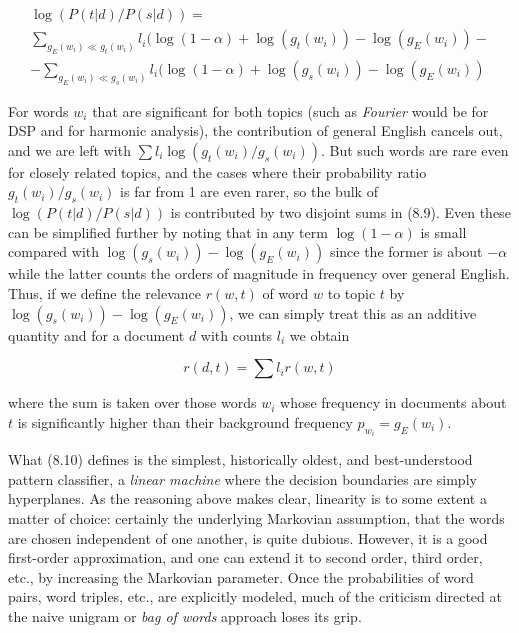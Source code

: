 \begin{eqnarray}
\log(P(t|d)/P(s|d)) = \nonumber\\
\sum_{g_E(w_i) \ll g_t(w_i)} l_i (\log(1-\alpha) +\log(g_t(w_i))-\log(g_E(w_i)) -\nonumber\\
- \sum_{g_E(w_i) \ll g_s(w_i)} l_i (\log(1-\alpha) +\log(g_s(w_i))-\log(g_E(w_i))
\end{eqnarray}
 
\noindent
For words $w_i$ that are significant for both topics (such as {\it Fourier}
would be for DSP and for harmonic analysis), the contribution of general
English cancels out, and we are left with $\sum l_i \log(g_t(w_i)/g_s(w_i))$.
But such words are rare even for closely related topics, and the cases where
their probability ratio $g_t(w_i)/g_s(w_i)$ is far from 1 are even rarer, so
the bulk of $\log(P(t|d)/P(s|d))$ is contributed by two disjoint sums in
(8.9). Even these can be simplified further by noting that in any term
$\log(1-\alpha)$ is small compared with $\log(g_s(w_i))-\log(g_E(w_i))$ since
the former is about $-\alpha$ while the latter counts the orders of magnitude
in frequency over general English. Thus, if we define the relevance $r(w,t)$
of word $w$ to topic $t$ by $\log(g_s(w_i))-\log(g_E(w_i))$, we can simply
treat this as an additive quantity and for a document $d$ with counts $l_i$ we
obtain

\begin{equation}
r(d,t)=\sum l_i r(w,t)
\end{equation}

\noindent
where the sum is taken over those words $w_i$ whose frequency in documents
about $t$ is significantly higher than their background frequency $p_{w_i}=
g_E(w_i)$. 

What (8.10) defines is the simplest, historically oldest, and best-understood
pattern classifier, a {\it linear machine} where the
decision boundaries are simply hyperplanes. As the reasoning above makes
clear, linearity is to some extent a matter of choice: certainly the
underlying Markovian assumption, that the words are chosen independent of one
another, is quite dubious. However, it is a good first-order approximation,
and one can extend it to second order, third order, etc., by increasing the
Markovian parameter. Once the probabilities of word pairs, word triples, etc.,
are explicitly modeled, much of the criticism directed at the naive unigram or
{\it bag of words} approach loses its grip.

